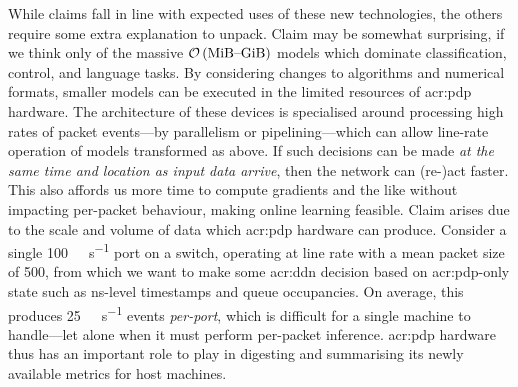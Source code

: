 While claims  fall in line with expected uses of these new technologies, the others require some extra explanation to unpack.
Claim  may be somewhat surprising, if we think only of the massive $\mathcal{O}\left(\text{\unit{\mebi\byte}--\unit{\gibi\byte}}\right)$ models which dominate classification, control, and language tasks.
By considering changes to algorithms and numerical formats, smaller models can be executed in the limited resources of \gls{acr:pdp} hardware.
The architecture of these devices is specialised around processing high rates of packet events---by parallelism or pipelining---which can allow line-rate operation of models transformed as above.
If such decisions can be made \emph{at the same time and location as input data arrive}, then the network can (re-)act faster.
This also affords us more time to compute gradients and the like without impacting per-packet behaviour, making online learning feasible.
Claim  arises due to the scale and volume of data which \gls{acr:pdp} hardware can produce.
Consider a single \qty{100}{\giga\bit\per\second} port on a switch, operating at line rate with a mean packet size of \qty{500}{\byte}, from which we want to make some \gls{acr:ddn} decision based on \gls{acr:pdp}-only state such as \unit{\nano\second}-level timestamps and queue occupancies.
On average, this produces \qty[per-symbol=p,sticky-per=true]{25}{\mega\packet\per\second} events \emph{per-port}, which is difficult for a single machine to handle---let alone when it must perform per-packet inference.
\gls{acr:pdp} hardware thus has an important role to play in digesting and summarising its newly available metrics for host machines.




